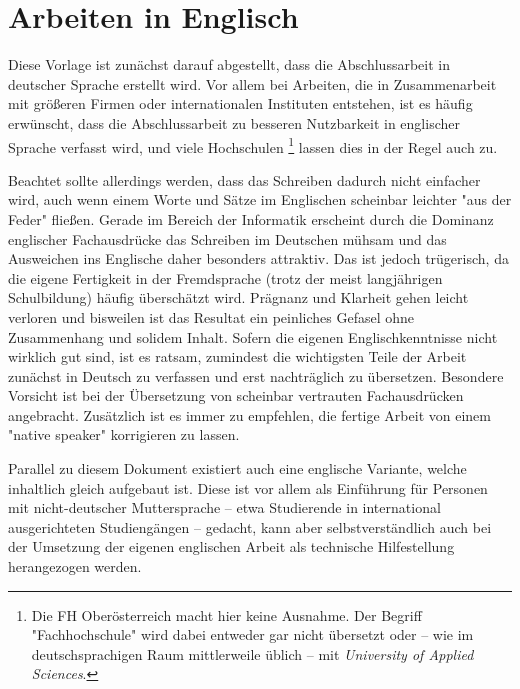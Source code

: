 \section{Arbeiten in Englisch}
\label{sec:german} %

Diese Vorlage ist zunächst darauf abgestellt, dass die Abschlussarbeit in
deutscher Sprache erstellt wird. Vor allem bei Arbeiten, die in
Zusammenarbeit mit größeren Firmen oder internationalen Instituten entstehen,
ist es häufig erwünscht, dass die Abschlussarbeit zu besseren Nutzbarkeit in
englischer Sprache verfasst wird, und viele Hochschulen%
\footnote{Die FH Oberösterreich macht hier keine Ausnahme. Der Begriff
"Fachhochschule" wird dabei entweder gar nicht übersetzt oder -- wie im
deutschsprachigen Raum mittlerweile üblich -- mit \emph{University of Applied
Sciences}.}
lassen dies in der Regel auch zu.

Beachtet sollte allerdings werden, dass das Schreiben dadurch nicht einfacher
wird, auch wenn einem Worte und Sätze im Englischen scheinbar leichter "aus
der Feder" fließen. Gerade im Bereich der Informatik erscheint durch die
Dominanz englischer Fachausdrücke das Schreiben im Deutschen mühsam und das
Ausweichen ins Englische daher besonders attraktiv. Das ist jedoch
trügerisch, da die eigene Fertigkeit in der Fremdsprache (trotz der meist
langjährigen Schulbildung) häufig überschätzt wird. Prägnanz und Klarheit
gehen leicht verloren und bisweilen ist das Resultat ein peinliches Gefasel
ohne Zusammenhang und solidem Inhalt. Sofern die eigenen Englischkenntnisse
nicht wirklich gut sind, ist es ratsam, zumindest die wichtigsten Teile der
Arbeit zunächst in Deutsch zu verfassen und erst nachträglich zu übersetzen.
Besondere Vorsicht ist bei der Übersetzung von scheinbar vertrauten
Fachausdrücken angebracht. Zusätzlich ist es immer zu empfehlen, die fertige
Arbeit von einem "native speaker" korrigieren zu lassen.

Parallel zu diesem Dokument existiert auch eine englische Variante, welche
inhaltlich gleich aufgebaut ist. Diese ist vor allem als Einführung für
Personen mit nicht-deutscher Muttersprache -- etwa Studierende in
international ausgerichteten Studiengängen -- gedacht, kann aber
selbstverständlich auch bei der Umsetzung der eigenen englischen Arbeit als
technische Hilfestellung herangezogen werden.

